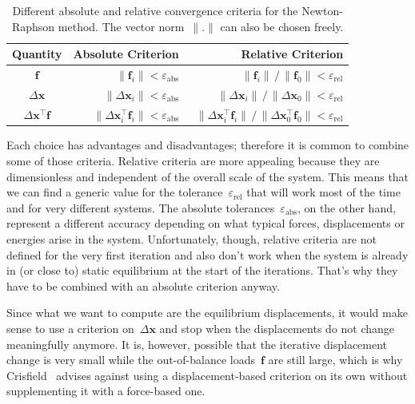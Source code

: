 \begin{table}[h]
\centering
\renewcommand{\arraystretch}{1.2}
\begin{tabular}{ | c | r | r | }
\hline
Quantity & Absolute Criterion & Relative Criterion \\
\hline
$\boldsymbol{f}$ &~$\lVert \boldsymbol{f}_{i} \rVert < \varepsilon_\mathrm{abs}$ &~$\lVert \boldsymbol{f}_{i} \rVert \,/\, \lVert \boldsymbol{f}_{0} \rVert < \varepsilon_\mathrm{rel}$ \\
$\Delta\boldsymbol{x}$ &~$\lVert \Delta\boldsymbol{x}_{i} \rVert < \varepsilon_\mathrm{abs}$ &~$\lVert \Delta\boldsymbol{x}_{i} \rVert \,/\, \lVert \Delta\boldsymbol{x}_{0} \rVert < \varepsilon_\mathrm{rel}$ \\
$\Delta\boldsymbol{x}^\intercal\boldsymbol{f}$ &~$\lVert \Delta\boldsymbol{x}_{i}^\intercal\boldsymbol{f}_{i} \rVert < \varepsilon_\mathrm{abs}$ &~$\lVert \Delta\boldsymbol{x}_{i}^\intercal\boldsymbol{f}_{i} \rVert \,/\, \lVert \Delta\boldsymbol{x}_{0}^\intercal\boldsymbol{f}_{0} \rVert < \varepsilon_\mathrm{rel}$ \\
\hline
\end{tabular}
\caption{Different absolute and relative convergence criteria for the Newton-Raphson method. The vector norm~$\lVert.\rVert$ can also be chosen freely.}
\label{tbl:convergence-criteria}
\end{table}

Each choice has advantages and disadvantages; therefore it is common to combine some of those criteria.
Relative criteria are more appealing because they are dimensionless and independent of the overall scale of the system.
This means that we can find a generic value for the tolerance~$\varepsilon_\mathrm{rel}$ that will work most of the time and for very different systems.
The absolute tolerances~$\varepsilon_\mathrm{abs}$, on the other hand, represent a different accuracy depending on what typical forces, displacements or energies arise in the system.
Unfortunately, though, relative criteria are not defined for the very first iteration and also don't work when the system is already in (or close to) static equilibrium at the start of the iterations.
That's why they have to be combined with an absolute criterion anyway.

Since what we want to compute are the equilibrium displacements, it would make sense to use a criterion on~$\Delta\boldsymbol{x}$ and stop when the displacements do not change meaningfully anymore.
It is, however, possible that the iterative displacement change is very small while the out-of-balance loads~$\boldsymbol{f}$ are still large, which is why Crisfield~\cite{bib:chrisfield1991} advises against using a displacement-based criterion on its own without supplementing it with a force-based one.

